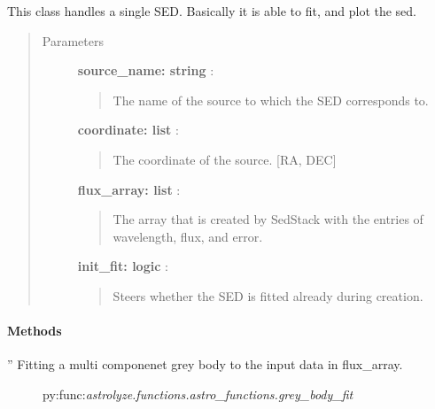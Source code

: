 \documentclass[a4paper,10pt,english]{sphinxmanual}
\begin{document}
\begin{fulllineitems}
\label{sed:astrolyze.sed.sed.Sed}
This class handles a single SED. Basically it is able to fit,
and plot the sed.
\begin{quote}\begin{description}
\item[{Parameters }] \leavevmode
\textbf{source\_name: string} :
\begin{quote}

The name of the source to which the SED corresponds to.
\end{quote}

\textbf{coordinate: list} :
\begin{quote}

The coordinate of the source. {[}RA, DEC{]}
\end{quote}

\textbf{flux\_array: list} :
\begin{quote}

The array that is created by SedStack with the entries of wavelength,
flux, and error.
\end{quote}

\textbf{init\_fit: logic} :
\begin{quote}

Steers whether the SED is fitted already during creation.
\end{quote}

\end{description}\end{quote}
\paragraph{Methods}

\begin{fulllineitems}
\label{sed:astrolyze.sed.sed.Sed.grey_body_fit}
''
Fitting a multi componenet grey body to the input data in flux\_array.



\begin{description}
\item[{\code{}}] \leavevmode
py:func:\emph{astrolyze.functions.astro\_functions.grey\_body\_fit}


\end{description}
\end{fulllineitems}
\end{fulllineitems}
\end{document}
